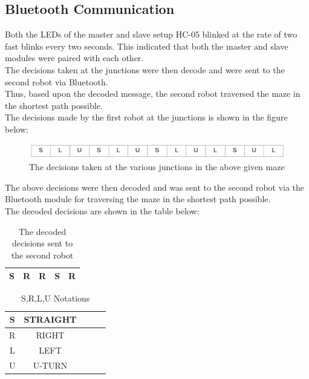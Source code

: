 \subsection{Bluetooth Communication}
Both the LEDs of the master and slave setup HC-05 blinked at the rate of two fast blinks every two seconds. This indicated that both the master and slave modules were paired with each other.\\
The decisions taken at the junctions were then decode and were sent to the second robot via Bluetooth.\\ 
Thus, based upon the decoded message, the second robot traversed the maze in the shortest path possible. \\
The decisions made by the first robot at the junctions is shown in the figure below:\\
\newpage
\begin{figure}[h]
\center
\includegraphics[scale=0.25]{packet_new.jpg} 
\caption{The decisions taken at the various junctions in the above given maze}
\end{figure}
\justify The above decisions were then decoded and was sent to the second robot via the Bluetooth module for traversing the maze in the shortest path possible.\\
\justify The decoded decisions are shown in the table below:
\begin{table}[h]
\begin{center}
\begin{tabular}{ |c|c|c|c|c| }
\hline 
S&R&R&S&R\\
\hline
\end{tabular}
\caption{The decoded decisions sent to the second robot}
\end{center}
\end{table}
\begin{table}[h]
\begin{center}
\begin{tabular}{ |c|c|c|c|c| }
\hline 
S&STRAIGHT\\
\hline 
R&RIGHT\\
\hline 
L&LEFT \\
\hline 
U&U-TURN\\
\hline
\end{tabular}
\caption{S,R,L,U Notations}
\end{center}
\end{table}
